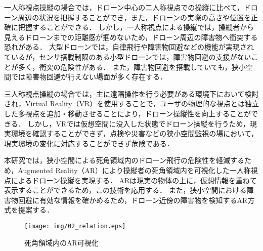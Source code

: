 \documentclass[submit]{ipsj}
\begin{document}
一人称視点操縦の場合では，ドローン中心の二人称視点での操縦に比べて，ドローン周辺の状況を把握することができ，また，ドローンの実際の高さや位置を正確に把握することができる\cite{book-drone02}．
しかし，一人称視点による操縦では，操縦者から見えるドローンまでの距離感が掴めないため\cite{article-ar01}\cite{article-ar02}，ドローン周辺の障害物へ衝突する恐れがある．
大型ドローンでは，自律飛行や障害物回避などの機能が実現されているが，センサ搭載制限のある小型ドローンでは，障害物回避の支援がないことが多く，衝突の危険性がある．
また，障害物回避を搭載していても，狭小空間では障害物回避が行えない場面が多く存在する\cite{article-drone12}．
\par
三人称視点操縦の場合では，主に遠隔操作を行う必要がある環境下において検討され，Virtual Reality（VR）を使用することで，ユーザの物理的な視点とは独立した多視点を追加・移動させることにより，ドローン操縦性を向上することができる\cite{book-drone04}．
しかし，VRでは仮想空間に没入した状態でドローン操縦を行うため\cite{article-drone13}，現実環境を確認することができず，点検や災害などの狭小空間監視の場において，現実環境の変化に対応することができず危険である．
\par
本研究では，狭小空間による死角領域内のドローン飛行の危険性を軽減するため，Augmented Reality（AR）により操縦者の死角領域内を可視化した一人称視点によるドローン操縦を実現する．
ARは現実の物体の上に，仮想情報を重ねて表示することができるため，この技術を応用する\cite{article-ar03}\cite{article-ar04}．
また，狭小空間における障害物回避に有効な情報を確かめるため，ドローン近傍の障害物を検知するAR方式を提案する．


\begin{figure}[tb]
  \centering
  \texttt{[image: img/02\_relation.eps]}
  \caption{死角領域内のAR可視化}
  \label{fig:02_relation}
  \end{figure}
  

\end{document}
